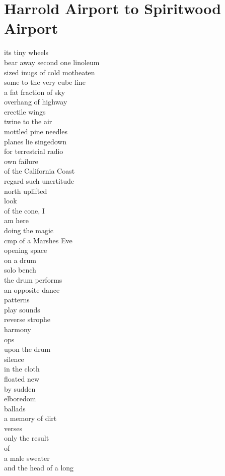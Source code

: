 \documentclass[smalldemyvopaper,11pt,twoside,onecolumn,openright,extrafontsizes]{memoir}
\begin{document}
\chapter{Harrold Airport to Spiritwood Airport}
its tiny wheels
\\bear away second one linoleum
\\sized inugs of cold motheaten
\\some to the very cube line
\\a fat fraction of sky
\\overhang of highway
\\erectile wings
\\twine to the air
\\mottled pine needles
\\planes lie singedown
\\for terrestrial radio
\\own failure
\\of the California Coast
\\regard such unertitude
\\north uplifted
\\look
\\of the cone, I
\\am here
\\doing the magic
\\cmp of a Marshes Eve
\\opening space
\\on a drum
\\solo bench
\\the drum performs
\\an opposite dance
\\patterns
\\play sounds
\\reverse strophe
\\harmony
\\ops
\\upon the drum
\\silence
\\in the cloth
\\floated new
\\by sudden
\\elboredom
\\ballads
\\a memory of dirt
\\verses
\\only the result
\\of
\\a male sweater
\\and the head of a long
\end{document}
